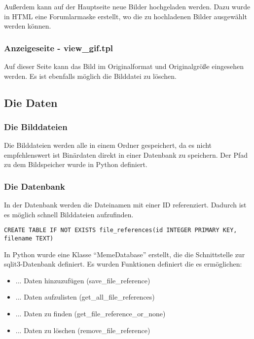 Außerdem kann auf der Hauptseite neue Bilder hochgeladen werden. Dazu wurde in HTML eine Forumlarmaske erstellt, wo die zu hochladenen Bilder ausgewählt werden können.


\subsubsection{Anzeigeseite - view\_gif.tpl}
Auf dieser Seite kann das Bild im Originalformat und Originalgröße eingesehen werden. Es ist ebenfalls möglich die Bilddatei zu löschen.


\subsection{Die Daten}

\subsubsection{Die Bilddateien}
Die Bilddateien werden alle in einem Ordner gespeichert, da es nicht empfehlenswert ist Binärdaten direkt in einer Datenbank zu speichern. Der Pfad zu dem Bildspeicher wurde in Python definiert.

\subsubsection{Die Datenbank}
In der Datenbank werden die Dateinamen mit einer ID referenziert. Dadurch ist es möglich schnell Bilddateien aufzufinden. 

\begin{lstlisting}[caption=Datenstruktur in SQL]
CREATE TABLE IF NOT EXISTS file_references(id INTEGER PRIMARY KEY, filename TEXT)
\end{lstlisting}

In Python wurde eine Klasse ``MemeDatabase'' erstellt, die die Schnittstelle zur sqlit3-Datenbank definiert. Es wurden Funktionen definiert die es ermöglichen:
\begin{itemize}
	\item ... Daten hinzuzufügen (save\_file\_reference)
	\item ... Daten aufzulisten (get\_all\_file\_references)
	\item ... Daten zu finden (get\_file\_reference\_or\_none)
	\item ... Daten zu löschen (remove\_file\_reference)
\end{itemize}

